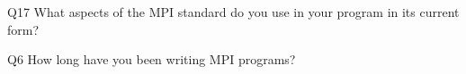 \begin{description}%
\item{Q17} What aspects of the MPI standard do you use in your program in its current form?%
\item{Q6} How long have you been writing MPI programs?%
\end{description}%
